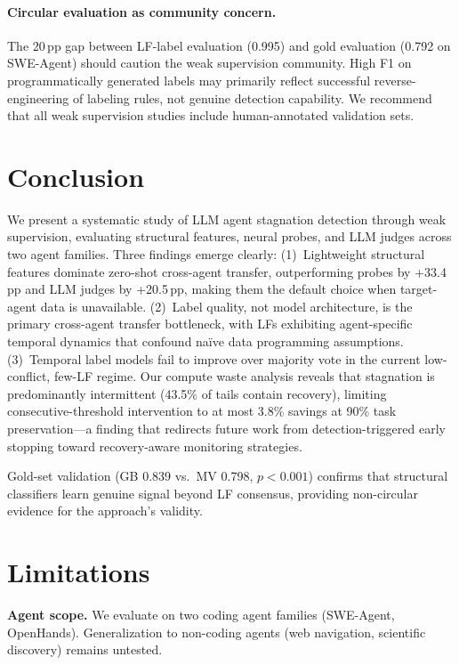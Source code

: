 \documentclass[11pt,a4paper]{article}
\begin{document}
\paragraph{Circular evaluation as community concern.}
The 20\,pp gap between LF-label evaluation (0.995) and gold evaluation (0.792 on SWE-Agent) should caution the weak supervision community.
High F1 on programmatically generated labels may primarily reflect successful reverse-engineering of labeling rules, not genuine detection capability.
We recommend that all weak supervision studies include human-annotated validation sets.

\section{Conclusion}
\label{sec:conclusion}

We present a systematic study of LLM agent stagnation detection through weak supervision, evaluating structural features, neural probes, and LLM judges across two agent families.
Three findings emerge clearly:
(1)~Lightweight structural features dominate zero-shot cross-agent transfer, outperforming probes by +33.4\,pp and LLM judges by +20.5\,pp, making them the default choice when target-agent data is unavailable.
(2)~Label quality, not model architecture, is the primary cross-agent transfer bottleneck, with LFs exhibiting agent-specific temporal dynamics that confound na\"ive data programming assumptions.
(3)~Temporal label models fail to improve over majority vote in the current low-conflict, few-LF regime.
Our compute waste analysis reveals that stagnation is predominantly intermittent (43.5\% of tails contain recovery), limiting consecutive-threshold intervention to at most 3.8\% savings at 90\% task preservation---a finding that redirects future work from detection-triggered early stopping toward recovery-aware monitoring strategies.

Gold-set validation (GB 0.839 vs.\ MV 0.798, $p < 0.001$) confirms that structural classifiers learn genuine signal beyond LF consensus, providing non-circular evidence for the approach's validity.

\section*{Limitations}

\textbf{Agent scope.} We evaluate on two coding agent families (SWE-Agent, OpenHands). Generalization to non-coding agents (web navigation, scientific discovery) remains untested.
\end{document}
